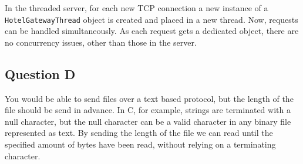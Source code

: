 \documentclass[11pt]{article}
\begin{document}
In the threaded server, for each new TCP connection a new instance of a \texttt{HotelGatewayThread} object is created and placed in a new thread. Now, requests can be handled simultaneously. As each request gets a dedicated object, there are no concurrency issues, other than those in the server.

\subsection{Question D}

You would be able to send files over a text based protocol, but the length of the file should be send in advance. In C, for example, strings are terminated with a null character, but the null character can be a valid character in any binary file represented as text. By sending the length of the file we can read until the specified amount of bytes have been read, without relying on a terminating character.
\end{document}
